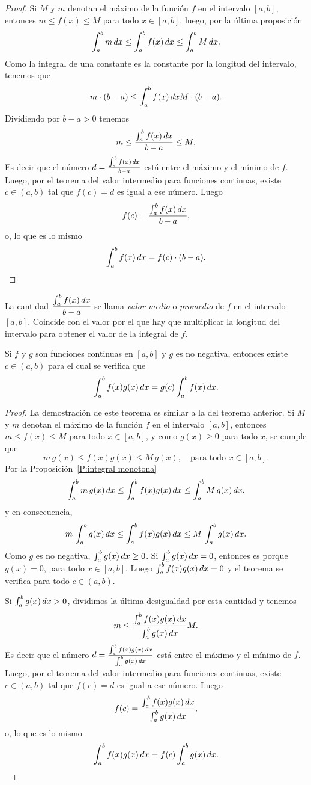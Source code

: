 \begin{proof}
  Si $M$ y $m$ denotan el máximo de la función $f$ en el intervalo $[a,b]$, entonces $m\le f(x)\le M$ para todo $x\in[a,b]$, luego, por la última proposición
  \[
  \int_a^b m\,dx
  \le \int_a^b f(x)\,dx
  \le \int_a^b M\,dx.
  \]
  Como la integral de una constante es la constante por la longitud del intervalo, tenemos que
  \[
    m\cdot(b-a)
    \le \int_a^b f(x)\,dx
    M\cdot(b-a).
  \]
  Dividiendo por $b-a>0$ tenemos
  \[
  m \le \frac{\int_a^b f(x)\,dx}{b-a}\le M.
  \]
  Es decir que el número $d=\frac{\int_a^b f(x)\,dx}{b-a}$ está entre el máximo y el mínimo de $f$. Luego, por el teorema del valor intermedio para funciones continuas, existe $c\in(a,b)$ tal que $f(c)=d$ es igual a ese número. Luego
  \[
  f(c) = \frac{\int_a^b f(x)\,dx}{b-a},
  \]
  o, lo que es lo mismo
  \[
  \int_a^b f(x)\,dx = f(c)\cdot(b-a).
  \qedhere
  \]
\end{proof}

\begin{remark}
  La cantidad $\displaystyle \frac{\int_a^b f(x)\,dx}{b-a}$ se llama \emph{valor medio} o \emph{promedio} de $f$ en el intervalo $[a,b]$. Coincide con el valor por el que hay que multiplicar la longitud del intervalo para obtener el valor de la integral de $f$.
\end{remark}

\begin{theorem}
Si $f$ y $g$ son funciones continuas en $[a,b]$ y $g$ es no negativa, entonces existe $c\in(a,b)$ para el cual se verifica que
\[
\int_a^b f(x)g(x)\,dx = g(c) \int_a^b f(x)\,dx.
\] 
\end{theorem}

\begin{proof}
  La demostración de este teorema es similar a la del teorema anterior. 
  Si $M$ y $m$ denotan el máximo de la función $f$ en el intervalo $[a,b]$, entonces $m\le f(x)\le M$ para todo $x\in[a,b]$, y como $g(x)\ge 0$ para todo $x$, se cumple que
  \[
  m\,g(x)\le f(x)g(x)\le M\,g(x), \quad\text{para todo $x\in[a,b]$.}
  \]
  Por la Proposición~\ref{P:integral monotona}
  \[
  \int_a^b m\,g(x)\,dx
  \le \int_a^b f(x)g(x)\,dx
  \le \int_a^b M\,g(x)\,dx,
  \]
  y en consecuencia,
  \[
    m\,\int_a^b g(x)\,dx
  \le \int_a^b f(x)g(x)\,dx
  \le M\,\int_a^b g(x)\,dx.
  \]
  Como $g$ es no negativa, $\int_a^b g(x)\,dx\ge 0$. 
  Si $\int_a^b g(x)\,dx=0$, entonces es porque $g(x)=0$, para todo $x\in[a,b]$.
  Luego $\int_a^b f(x)g(x)\,dx=0$ y el teorema se verifica para todo $c\in(a,b)$.
  
  Si $\int_a^b g(x)\,dx > 0$, dividimos la última desigualdad por esta cantidad y tenemos
  \[
    m
    \le \frac{\int_a^b f(x)g(x)\,dx}{\int_a^b g(x)\,dx}
    M.
  \]
  Es decir que el número $d=\frac{\int_a^b f(x)g(x)\,dx}{\int_a^b g(x)\,dx}$ está entre el máximo y el mínimo de $f$. Luego, por el teorema del valor intermedio para funciones continuas, existe $c\in(a,b)$ tal que $f(c)=d$ es igual a ese número. Luego
  \[
  f(c) = \frac{\int_a^b f(x)g(x)\,dx}{\int_a^b g(x)\,dx},
  \]
  o, lo que es lo mismo
  \[
  \int_a^b f(x)g(x)\,dx = f(c)\int_a^b g(x)\,dx.
  \qedhere
  \]
\end{proof}

